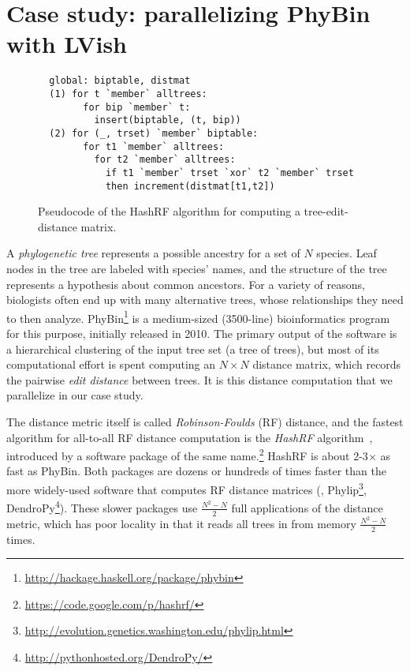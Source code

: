 \section{Case study: parallelizing PhyBin with LVish}\label{s:lvish-phybin}

\begin{figure}
  \centering
\begin{lstlisting}
  global: biptable, distmat
  (1) for t `member` alltrees:
        for bip `member` t:
          insert(biptable, (t, bip))
  (2) for (_, trset) `member` biptable: 
        for t1 `member` alltrees:
          for t2 `member` alltrees:
            if t1 `member` trset `xor` t2 `member` trset
            then increment(distmat[t1,t2])
\end{lstlisting}  
  \caption{Pseudocode of the HashRF algorithm for computing a tree-edit-distance matrix.}
  \label{f:hashrf-alg}
\end{figure}


A {\em phylogenetic tree} represents a possible ancestry for a set of $N$ species.
Leaf nodes in the tree are labeled with species' names, and the structure of the
tree represents a hypothesis about common ancestors. For a variety of reasons, biologists often end up
with many alternative trees, whose relationships they need to then analyze.
PhyBin\footnote{\url{http://hackage.haskell.org/package/phybin}} is a medium-sized (3500-line)
bioinformatics program for this purpose, initially released in 2010.
%
The primary output of the 
software is a hierarchical clustering of the input tree set (a tree
of trees), but most of its computational effort is spent computing an
$N{\times}N$ 
distance matrix, which records the pairwise 
{\em edit distance} between trees.
It is this distance computation that we parallelize in our case study.

The distance metric itself is called {\em Robinson-Foulds} (RF) distance, and
the fastest algorithm for all-to-all RF distance computation is the {\em HashRF}
algorithm~\cite{hashrf}, introduced by a software package of the same name.\footnote{\url{https://code.google.com/p/hashrf/}}  HashRF is about
2-3$\times$ as fast as PhyBin.  Both packages are dozens or hundreds of times faster
than the more widely-used software that computes RF distance matrices (\eg{}, Phylip\footnote{\url{http://evolution.genetics.washington.edu/phylip.html}}, DendroPy\footnote{\url{http://pythonhosted.org/DendroPy/}}).  These
slower packages use $\frac{N^2-N}{2}$ full applications of the distance metric, which has poor
locality in that it reads all trees in from memory $\frac{N^2-N}{2}$ times.
%

